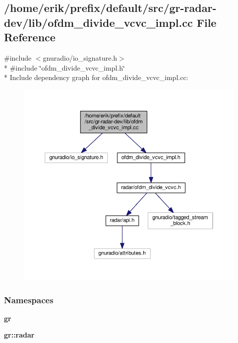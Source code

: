 \subsection{/home/erik/prefix/default/src/gr-\/radar-\/dev/lib/ofdm\+\_\+divide\+\_\+vcvc\+\_\+impl.cc File Reference}
\label{ofdm__divide__vcvc__impl_8cc}
{\ttfamily \#include $<$gnuradio/io\+\_\+signature.\+h$>$}\\*
{\ttfamily \#include \char`\"{}ofdm\+\_\+divide\+\_\+vcvc\+\_\+impl.\+h\char`\"{}}\\*
Include dependency graph for ofdm\+\_\+divide\+\_\+vcvc\+\_\+impl.\+cc\+:
\nopagebreak
\begin{figure}[H]
\begin{center}
\leavevmode
\includegraphics[width=350pt]{d5/db9/ofdm__divide__vcvc__impl_8cc__incl}
\end{center}
\end{figure}
\subsubsection*{Namespaces}
\begin{DoxyCompactItemize}
\item 
 {\bf gr}
\item 
 {\bf gr\+::radar}
\end{DoxyCompactItemize}

